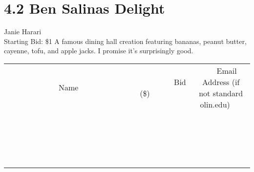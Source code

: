 \documentclass[11pt]{article}
\begin{document}
\section*{4.2 Ben Salinas Delight}
Janie Harari
\\
Starting Bid: \$1
\newline
A famous dining hall creation featuring bananas, peanut butter, cayenne, tofu, and apple jacks.  I promise it's surprisingly good.
\\[3ex]
\begin{tabular}{c c c}
~~~~~~~~~~~~~Name~~~~~~~~~~~~~ & ~~~~~~~~~Bid (\$)~~~~~~~~~  & ~~~Email Address (if not standard olin.edu)~~~\\
 & & \\
\hline
 & & \\
\hline
 & & \\
\hline
 & & \\
\hline
 & & \\
\hline
 & & \\
\hline
 & & \\
\hline
 & & \\
\hline
 & & \\
\hline
 & & \\
\hline
 & & \\
\hline
 & & \\
\hline
 & & \\
\hline
 & & \\
\hline
 & & \\
\hline
 & & \\
\hline
 & & \\
\hline
 & & \\
\hline
 & & \\
\hline
\end{tabular}
\newpage
\end{document}
